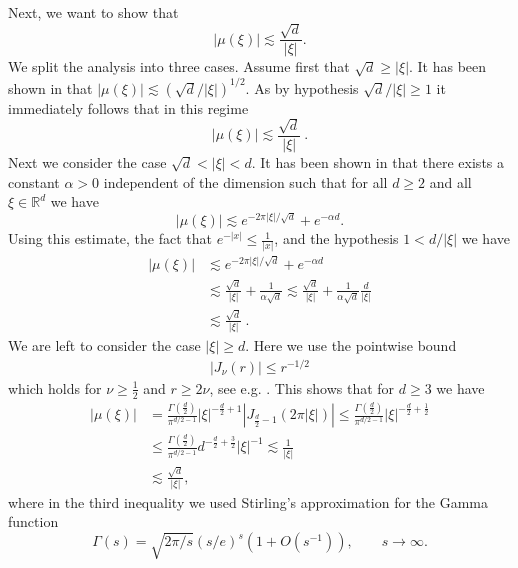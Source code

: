 \documentclass[a4paper, reqno]{amsart}
\theoremstyle{definition}
\begin{document}
Next, we want to show that 
$$|\mu(\xi)| \lesssim \frac{\sqrt{d}}{|\xi|}.$$ 
We split the analysis into three cases. Assume first that $\sqrt{d}\geq |\xi|$. It has been shown in \cite[Equation~4.10]{MSW24} that  $|\mu(\xi)|\lesssim (\sqrt{d}/|\xi|)^{1/2}$. 
As by hypothesis $\sqrt{d}/|\xi|\geq 1$ it immediately follows that in this regime
$$|\mu(\xi)|\lesssim\frac{\sqrt{d}}{|\xi|}~.$$
Next we consider the case $\sqrt{d} < |\xi|<d$. It has been shown in \cite[Lemma~4.1]{MSW24} that there exists a constant $\alpha>0$ independent of the dimension such that for all $d\geq 2$ and all $\xi\in\mathbb{R}^d$ we have
$$|\mu(\xi)|\lesssim  e^{-2\pi|\xi|/\sqrt{d}}+e^{-\alpha d}.$$
Using this estimate, the fact that $e^{-|x|}\leq \tfrac{1}{|x|}$, and the hypothesis $1 < d/|\xi|$ we have 
\begin{align*}
    |\mu(\xi)|& \lesssim e^{-2\pi|\xi|/\sqrt{d}}+e^{-\alpha d}  \\
    & \lesssim \frac{\sqrt{d}}{|\xi|} +\frac{1}{\alpha\sqrt{d}}  \lesssim   \frac{\sqrt{d}}{|\xi|} +\frac{1}{\alpha\sqrt{d}}\frac{d}{|\xi|} \\
    & \lesssim \frac{\sqrt{d}}{|\xi|}~.
\end{align*}
We are left to consider the case $|\xi|\geq d$. Here we use the pointwise bound 
\begin{align}\label{eq_bessel_leq_r_power_minus_one_half}
|J_\nu(r)|\leq r^{-1/2}
\end{align}
which holds for $\nu\geq \tfrac{1}{2}$ and $r\geq 2\nu$, see e.g. \cite[Theorem~3]{Kr14}. This shows that for $d\ge 3$ we have
\begin{align*}
    |\mu(\xi)| & =\frac{\Gamma(\tfrac{d}{2})}{\pi^{d/2-1}}|\xi|^{-\tfrac{d}{2}+1} |J_{\tfrac{d}{2}-1}(2\pi|\xi|)| \leq \frac{\Gamma(\tfrac{d}{2})}{\pi^{d/2-1}}|\xi|^{-\tfrac{d}{2}+\tfrac{1}{2}} \\
    & \leq \frac{\Gamma(\tfrac{d}{2})}{\pi^{d/2-1}}d^{-\tfrac{d}{2}+\tfrac{3}{2}}|\xi|^{-1} \lesssim\frac{1}{|\xi|}\\
    & \lesssim\frac{\sqrt{d}}{|\xi|},
\end{align*}
where in the third inequality we used Stirling's approximation for the Gamma function 
\begin{equation}
\label{eq: Stirling}
\Gamma(s) = \sqrt{2 \pi /s} (s / e)^{s} (1 + O(s^{-1})),\qquad s \to \infty.
\end{equation}
\end{document}
